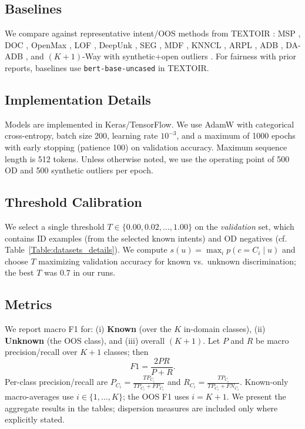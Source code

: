\documentclass[journal,letterpaper]{IEEEtran}
\begin{document}
\subsection{Baselines}
We compare against representative intent/OOS methods from TEXTOIR \cite{zhang-etal-2021-textoir}: MSP \cite{hendrycks2018baseline}, DOC \cite{shu-etal-2017-doc}, OpenMax \cite{bendale2015open}, LOF \cite{Breunig2000}, DeepUnk \cite{lin-xu-2019-deep}, SEG \cite{yan-etal-2020-unknown}, MDF \cite{xu-etal-2021-unsupervised}, KNNCL \cite{zhou-etal-2022-knn}, ARPL \cite{Guangyao2022}, ADB \cite{Zhang_2021}, DA-ADB \cite{DA-ADB_2023}, and $(K{+}1)$-Way with synthetic+open outliers \cite{Zhan_2021}. For fairness with prior reports, baselines use \texttt{bert-base-uncased} in TEXTOIR.

\subsection{Implementation Details}
Models are implemented in Keras/TensorFlow. We use AdamW \cite{Adam} with categorical cross-entropy, batch size 200, learning rate $10^{-3}$, and a maximum of 1000 epochs with early stopping (patience 100) on validation accuracy. Maximum sequence length is 512 tokens. Unless otherwise noted, we use the operating point of 500 OD and 500 synthetic outliers per epoch.

\subsection{Threshold Calibration}
We select a single threshold \(T\in\{0.00,0.02,\ldots,1.00\}\) on the \emph{validation} set, which contains ID examples (from the selected known intents) and OD negatives (cf. Table~\ref{Table:datasets_details}). We compute \(s(u)=\max_i p(c{=}C_i\mid u)\) and choose \(T\) maximizing validation accuracy for known vs.\ unknown discrimination; the best \(T\) was \(0.7\) in our runs.

\subsection{Metrics}
We report macro F1 for: (i) \textbf{Known} (over the $K$ in-domain classes), (ii) \textbf{Unknown} (the OOS class), and (iii) overall $(K{+}1)$. Let $P$ and $R$ be macro precision/recall over $K{+}1$ classes; then
\begin{equation}
\label{eq:f1}
F1=\frac{2PR}{P+R}.
\end{equation}
Per-class precision/recall are $P_{C_i}=\frac{TP_{C_i}}{TP_{C_i}+FP_{C_i}}$ and $R_{C_i}=\frac{TP_{C_i}}{TP_{C_i}+FN_{C_i}}$. Known-only macro-averages use $i\in\{1,\ldots,K\}$; the OOS F1 uses $i=K{+}1$. We present the aggregate results in the tables; dispersion measures are included only where explicitly stated.
\end{document}
